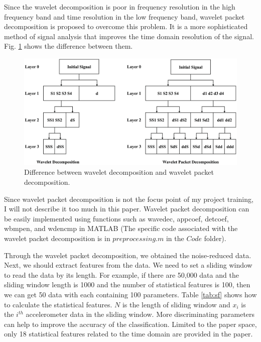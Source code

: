 \documentclass{bioinfo}
\begin{document}
Since the wavelet decomposition \cite{Walczak1997Noise} is poor in frequency resolution in the high frequency band and time resolution in the low frequency band, wavelet packet decomposition is proposed to overcome this problem. It is a more sophisticated method of signal analysis that improves the time domain resolution of the signal. Fig. \ref{fig:wpd} shows the difference between them.

\begin{figure}[htbp]
	\centering
	\includegraphics[width=\columnwidth]{wpd.eps}
	\caption{Difference between wavelet decomposition and wavelet packet decomposition.}
	\label{fig:wpd}
\end{figure}

Since wavelet packet decomposition is not the focus point of my project training, I will not describe it too much in this paper. Wavelet packet decomposition can be easily implemented using functions such as wavedec, appcoef, detcoef, wbmpen, and wdencmp in MATLAB (The specific code associated with the wavelet packet decomposition is in $preprocessing.m$ in the $Code$ folder).

Through the wavelet packet decomposition, we obtained the noise-reduced data. Next, we should extract features from the data. We need to set a sliding window to read the data by its length. For example, if there are 50,000 data and the sliding window length is 1000 and the number of statistical features is 100, then we can get 50 data with each containing 100 parameters. Table \ref{tab:sf} shows how to calculate the statistical features. $N$ is the length of sliding window and $x_i$ is the $i^{th}$ accelerometer data in the sliding window. More discriminating parameters can help to improve the accuracy of the classification. Limited to the paper space, only 18 statistical features related to the time domain are provided in the paper.
\end{document}
